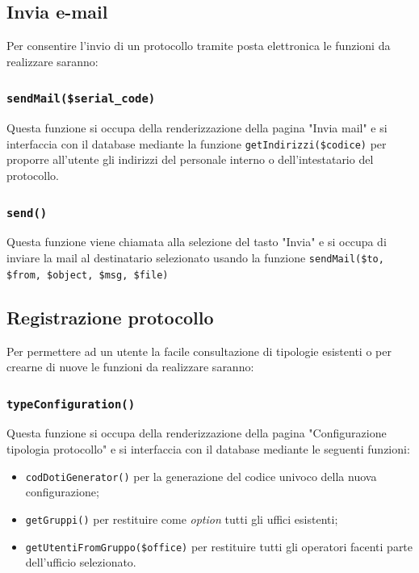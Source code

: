     \subsection{Invia e-mail}
    Per consentire l'invio di un protocollo tramite posta elettronica le funzioni da realizzare saranno:
    
    \subsubsection{\texttt{sendMail(\$serial\_code)}}
     Questa funzione si occupa della renderizzazione della pagina "Invia mail" e si interfaccia con il database mediante la funzione \texttt{getIndirizzi(\$codice)} per proporre all'utente gli indirizzi del personale interno o dell'intestatario del protocollo.
    
    \subsubsection{\texttt{send()}}
    Questa funzione viene chiamata alla selezione del tasto "Invia" e si occupa di inviare la mail al destinatario selezionato usando la funzione \texttt{sendMail(\$to, \$from, \$object, \$msg, \$file)}
    
    \subsection{Registrazione protocollo}
    Per permettere ad un utente la facile consultazione di tipologie esistenti o per crearne di nuove le funzioni da realizzare saranno:
    
    \subsubsection{\texttt{typeConfiguration()}}
    Questa funzione si occupa della renderizzazione della pagina "Configurazione tipologia protocollo" e si interfaccia con il database mediante le seguenti funzioni:
    \begin{itemize}
        \item \texttt{codDotiGenerator()} per la generazione del codice univoco della nuova configurazione;
        \item \texttt{getGruppi()} per restituire come \textit{option} tutti gli uffici esistenti;
        \item \texttt{getUtentiFromGruppo(\$office)} per restituire tutti gli operatori facenti parte dell'ufficio selezionato.
    \end{itemize}
    
